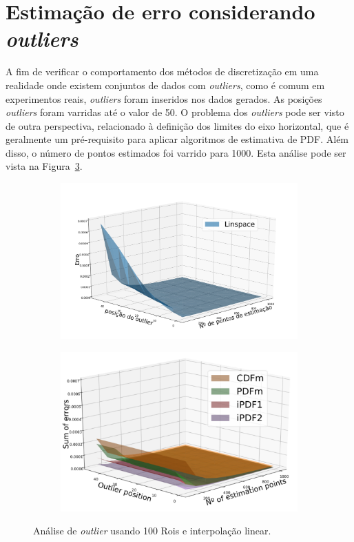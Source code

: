 \section{Estimação de erro considerando \textit{outliers}} \label{cap:erro_out}

A fim de verificar o comportamento dos métodos de discretização em uma realidade onde existem conjuntos de dados com \textit{outliers}, como é comum em experimentos reais, \textit{outliers} foram inseridos nos dados gerados. As posições \textit{outliers} foram varridas até o valor de 50.
O problema dos \textit{outliers} pode ser visto de outra perspectiva, relacionado à definição dos limites do eixo horizontal, que é geralmente um pré-requisito para aplicar algoritmos de estimativa de \ac{PDF}.
Além disso, o número de pontos estimados foi varrido para 1000. Esta análise pode ser vista na Figura~\ref{fig:13}.

\begin{figure}[H]
	\centering
	\begin{subfigure}[b]{0.45\textwidth}
		\centering 
		\includegraphics[width=\textwidth]{./figuras/erro3d_linspace}
		\caption{}
		\label{fig:13a}
	\end{subfigure}
	\hfill
	\begin{subfigure}[b]{0.45\textwidth}
		\centering 
		\includegraphics[width=\textwidth]{./figuras/figure13b.pdf}
		\caption{}
		\label{fig:13b}
	\end{subfigure}
	\caption{Análise de \textit{outlier} usando 100 Rois e interpolação linear.}
	\label{fig:13}
\end{figure}

